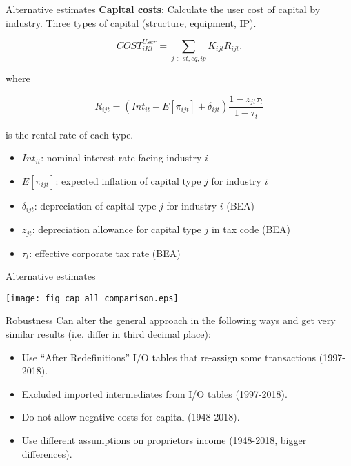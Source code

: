 \documentclass[10pt,xcolor=dvipsnames]{beamer}
\begin{document}
\begin{frame}{Alternative estimates}\label{Susercost}
\textbf{Capital costs}: Calculate the user cost of capital by industry. Three types of capital (structure, equipment, IP).

\begin{equation}
  COST^{User}_{iKt} = \sum_{j \in st,eq,ip} K_{ijt} R_{ijt}.
\end{equation}

where 

\begin{equation}
  R_{ijt} = (Int_{it} - E[\pi_{ijt}] + \delta_{ijt})\frac{1-z_{jt} \tau_t}{1-\tau_t}
\end{equation}

is the rental rate of each type. 

\begin{itemize}
  \item $Int_{it}$: nominal interest rate facing industry $i$
  \item $E[\pi_{ijt}]$: expected inflation of capital type $j$ for industry $i$
  \item $\delta_{ijt}$: depreciation of capital type $j$ for industry $i$ (BEA)
  \item $z_{jt}$: depreciation allowance for capital type $j$ in tax code (BEA)
  \item $\tau_t$: effective corporate tax rate (BEA)
\end{itemize}
\vspace{.25in} \hfill \hyperlink{Ausercost}{}
\end{frame}

\begin{frame}{Alternative estimates}
\begin{center}
\texttt{[image: fig\_cap\_all\_comparison.eps]}
\end{center}
\end{frame}

\begin{frame}{Robustness}
Can alter the general approach in the following ways and get very similar results (i.e. differ in third decimal place):
\begin{itemize}
  \item Use ``After Redefinitions'' I/O tables that re-assign some transactions (1997-2018). 
  \item Excluded imported intermediates from I/O tables (1997-2018). 
  \item Do not allow negative costs for capital (1948-2018). 
  \item Use different assumptions on proprietors income (1948-2018, bigger differences).
\end{itemize}
\end{frame}
\end{document}
